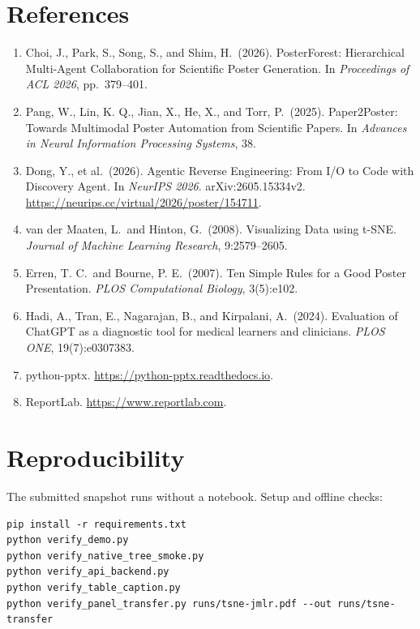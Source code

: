 \documentclass{article}
\begin{document}
\section*{References}
{\small
\begin{enumerate}
  \item Choi, J., Park, S., Song, S., and Shim, H.\ (2026). PosterForest: Hierarchical Multi-Agent Collaboration for Scientific Poster Generation. In \emph{Proceedings of ACL 2026}, pp.\ 379--401.
  \item Pang, W., Lin, K. Q., Jian, X., He, X., and Torr, P.\ (2025). Paper2Poster: Towards Multimodal Poster Automation from Scientific Papers. In \emph{Advances in Neural Information Processing Systems}, 38.
  \item Dong, Y., et al.\ (2026). Agentic Reverse Engineering: From I/O to Code with Discovery Agent. In \emph{NeurIPS 2026}. arXiv:2605.15334v2. \url{https://neurips.cc/virtual/2026/poster/154711}.
  \item van der Maaten, L.\ and Hinton, G.\ (2008). Visualizing Data using t-SNE. \emph{Journal of Machine Learning Research}, 9:2579--2605.
  \item Erren, T. C.\ and Bourne, P. E.\ (2007). Ten Simple Rules for a Good Poster Presentation. \emph{PLOS Computational Biology}, 3(5):e102.
  \item Hadi, A., Tran, E., Nagarajan, B., and Kirpalani, A.\ (2024). Evaluation of ChatGPT as a diagnostic tool for medical learners and clinicians. \emph{PLOS ONE}, 19(7):e0307383.
  \item python-pptx. \url{https://python-pptx.readthedocs.io}.
  \item ReportLab. \url{https://www.reportlab.com}.
\end{enumerate}
}

\appendix
\section{Reproducibility}
\label{sec:repro}

The submitted snapshot runs without a notebook. Setup and offline checks:

\begin{verbatim}
pip install -r requirements.txt
python verify_demo.py
python verify_native_tree_smoke.py
python verify_api_backend.py
python verify_table_caption.py
python verify_panel_transfer.py runs/tsne-jmlr.pdf --out runs/tsne-transfer
\end{verbatim}
\end{document}
